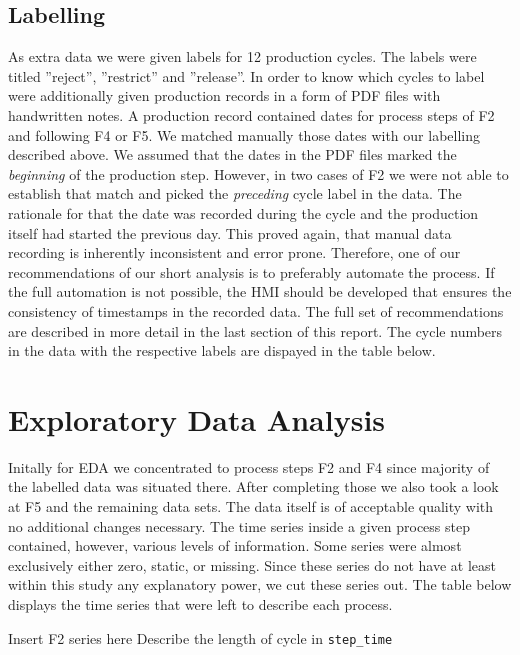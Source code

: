 \documentclass{article}
\begin{document}
\subsection{Labelling}
As extra data we were given labels for 12 production cycles. The labels were titled ''reject'', ''restrict'' and ''release''. In order to know which cycles to label were additionally given production records in a form of PDF files with handwritten notes. A production record contained dates for process steps of F2 and following F4 or F5. We matched manually those dates with our labelling described above. We assumed that the dates in the PDF files marked the \emph{beginning} of the production step. However, in two cases of F2 we were not able to establish that match and picked the \emph{preceding} cycle label in the data. The rationale for that the date was recorded during the cycle and the production itself had started the previous day. This proved again, that manual data recording is inherently inconsistent and error prone. Therefore, one of our recommendations of our short analysis is to preferably automate the process. If the full automation is not possible, the HMI should be developed that ensures the consistency of timestamps in the recorded data. The full set of recommendations are described in more detail in the last section of this report. The cycle numbers in the data with the respective labels are dispayed in the table below.

\begin{tabular}
\end{tabular}

\section{Exploratory Data Analysis}
Initally for EDA we concentrated to process steps F2 and F4 since majority of the labelled data was situated there. After completing those we also took a look at F5 and the remaining data sets. The data itself is of acceptable quality with no additional changes necessary. The time series inside a given process step contained, however, various levels of information. Some series were almost exclusively either zero, static, or missing. Since these series do not have at least within this study any explanatory power, we cut these series out. The table below displays the time series that were left to describe each process.

Insert F2 series here
Describe the length of cycle in \texttt{step\_time}
\end{document}

